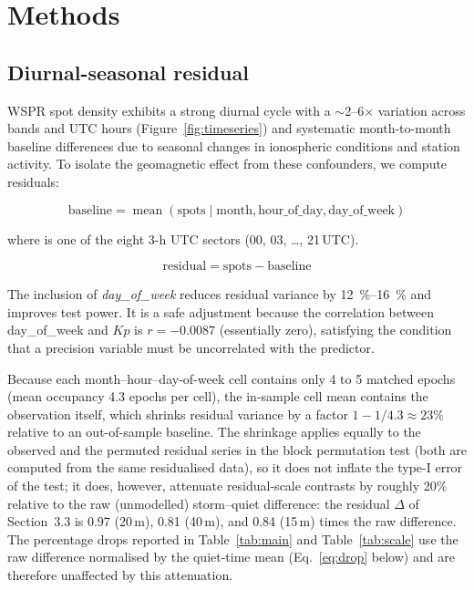 \documentclass{agujournal2019}
\begin{document}
\section{Methods}

\subsection{Diurnal-seasonal residual}

WSPR spot density exhibits a strong diurnal cycle with a
$\sim$2--6$\times$ variation across bands and UTC hours
(Figure~\ref{fig:timeseries}) and systematic month-to-month baseline
differences due to seasonal changes in ionospheric conditions and station
activity. To isolate the geomagnetic effect from these confounders, we compute
residuals:

\begin{equation}
	\text{baseline} = \operatorname{mean}(\text{spots} \mid \text{month},
	\text{hour\_of\_day}, \text{day\_of\_week})
	\label{eq:baseline}
\end{equation}

where  is one of the eight 3-h UTC sectors
(00, 03, \ldots, 21\,UTC).

\begin{equation}
	\text{residual} = \text{spots} - \text{baseline}
	\label{eq:residual}
\end{equation}

The inclusion of \emph{day\_of\_week} reduces residual variance by
\SIrange{12}{16}{\percent} and improves test power. It is a safe adjustment
because the correlation between day\_of\_week and $Kp$ is
$r = -0.0087$ (essentially zero), satisfying the condition that a precision
variable must be uncorrelated with the predictor.

Because each month--hour--day-of-week cell contains only 4 to 5
matched epochs (mean occupancy 4.3 epochs per cell), the in-sample
cell mean contains the observation itself, which shrinks residual
variance by a factor $1 - 1/4.3 \approx 23\%$ relative to an
out-of-sample baseline. The shrinkage applies equally to the
observed and the permuted residual series in the block permutation
test (both are computed from the same residualised data), so it
does not inflate the type-I error of the test; it does, however,
attenuate residual-scale contrasts by roughly 20\% relative to the
raw (unmodelled) storm--quiet difference: the residual $\Delta$ of
Section~3.3 is 0.97 (20\,m), 0.81 (40\,m), and 0.84 (15\,m) times
the raw difference. The percentage drops reported in
Table~\ref{tab:main} and Table~\ref{tab:scale} use the raw
difference normalised by the quiet-time mean
(Eq.~\eqref{eq:drop} below) and are therefore unaffected by this
attenuation.
\end{document}
